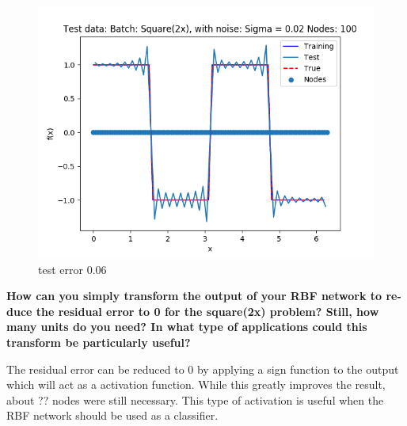 \documentclass{article}
\begin{document}
\begin{figure}[ht!]
  \centering
  \includegraphics[width=0.5\linewidth]{plots/batch/best_square2x_extreme}
  \caption{test error 0.06}
  \label{}
\end{figure}

\textbf{How can you simply transform the output of your RBF network to re- duce the residual error to 0 for the square(2x) problem? Still, how many units do you need? In what type of applications could this transform be particularly useful?}

The residual error can be reduced to 0 by applying a sign function to the output which will act as a activation function. While this greatly improves the result, about ?? nodes were still necessary. This type of activation is useful when the RBF network should be used as a classifier.
\end{document}
